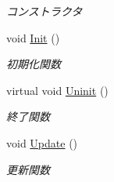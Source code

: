 \begin{DoxyCompactItemize}
\begin{DoxyCompactList}\small\item\em コンストラクタ \end{DoxyCompactList}\item 
void \mbox{\hyperlink{class_game_scene_a0ed06e4578a96910725641fb1a74d958}{Init}} ()
\begin{DoxyCompactList}\small\item\em 初期化関数 \end{DoxyCompactList}\item 
virtual void \mbox{\hyperlink{class_game_scene_a8b96bb5d72109ab37729f05f4f78c43e}{Uninit}} ()
\begin{DoxyCompactList}\small\item\em 終了関数 \end{DoxyCompactList}\item 
void \mbox{\hyperlink{class_game_scene_a4a7840220ef38af15def6d25159c93f3}{Update}} ()
\begin{DoxyCompactList}\small\item\em 更新関数 \end{DoxyCompactList}\end{DoxyCompactItemize}

